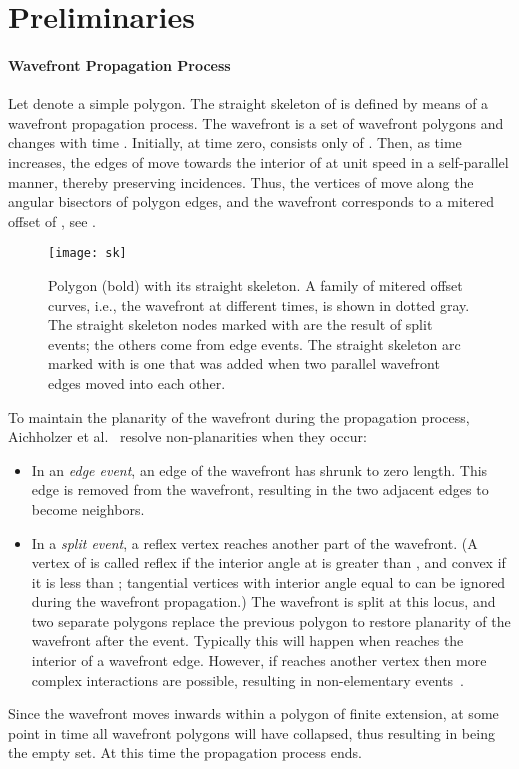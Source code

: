 \documentclass[preprint]{elsarticle}
\begin{document}
\section{Preliminaries} \label{sec:prelim}


\paragraph{Wavefront Propagation Process}

Let  denote a simple polygon.  The straight skeleton of  is
defined by means of a wavefront propagation process.  The wavefront
 is a set of wavefront polygons and changes with time .
Initially, at time zero,  consists only of .  Then, as time
increases, the edges of  move towards the interior of  at unit
speed in a self-parallel manner, thereby preserving incidences.  Thus, the
vertices of  move along the angular bisectors of polygon edges, and
the wavefront corresponds to a mitered offset of , see .

\begin{figure}[htb!]
  \centering
  \texttt{[image: sk]}
    \caption{Polygon (bold) with its straight skeleton.
       A family of mitered offset curves, i.e., the wavefront at different
       times, is shown in dotted gray.
The straight skeleton nodes marked with  are the result of
       split events; the others come from edge events.
The straight skeleton arc marked with  is one that was added
       when two parallel wavefront edges moved into each other.
     }
  \label{fig:sk}
\end{figure}

To maintain the planarity of the wavefront during the propagation process,
Aichholzer et al.~\cite{Aic&95} resolve non-planarities when they occur:
\begin{itemize}
  \item
    In an \emph{edge event}, an edge of the wavefront has shrunk to zero
    length.  This edge is removed from the wavefront, resulting in the two
    adjacent edges to become neighbors.
  \item In a \emph{split event}, a reflex vertex  reaches another
    part of the wavefront.  (A vertex  of  is called reflex if
    the interior angle at  is greater than , and
    convex if it is less than ; tangential vertices with
    interior angle equal to  can be ignored during the
    wavefront propagation.) The wavefront is split at this locus, and
    two separate polygons replace the previous polygon to restore
    planarity of the wavefront after the event.  Typically this will
    happen when  reaches the interior of a wavefront edge.
    However, if  reaches another vertex then more complex
    interactions are possible, resulting in non-elementary
    events~\cite{BieHP14b}.
\end{itemize}
Since the wavefront moves inwards within a polygon of finite extension, at
some point  in time all wavefront polygons will have collapsed, thus
resulting in  being the empty set. At this time  the
propagation process ends.
\end{document}
